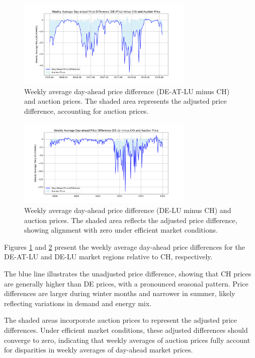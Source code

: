 \documentclass[12pt]{article}
\begin{document}
\begin{figure}[ht]
    \centering
    \includegraphics[width=0.75\textwidth]{figures/weekly_average_day_ahead_price_diff_de-lu-at_ch.png}
    \caption{Weekly average day-ahead price difference (DE-AT-LU minus CH) and auction prices. The shaded area represents the adjusted price difference, accounting for auction prices.}
    \label{fig:weekly_de_at_lu_ch}
\end{figure}

\begin{figure}[ht]
    \centering
    \includegraphics[width=0.75\textwidth]{figures/weekly_average_day_ahead_price_diff_de-lu_ch.png}
    \caption{Weekly average day-ahead price difference (DE-LU minus CH) and auction prices. The shaded area reflects the adjusted price difference, showing alignment with zero under efficient market conditions.}
    \label{fig:weekly_de_lu_ch}
\end{figure}

\noindent
Figures \ref{fig:weekly_de_at_lu_ch} and \ref{fig:weekly_de_lu_ch} present the weekly average day-ahead price differences for the DE-AT-LU and DE-LU market regions relative to CH, respectively. 

The blue line illustrates the unadjusted price difference, showing that CH prices are generally higher than DE prices, with a pronounced seasonal pattern. Price differences are larger during winter months and narrower in summer, likely reflecting variations in demand and energy mix.

The shaded areas incorporate auction prices to represent the adjusted price differences. Under efficient market conditions, these adjusted differences should converge to zero, indicating that weekly averages of auction prices fully account for disparities in weekly averages of day-ahead market prices.
\end{document}
